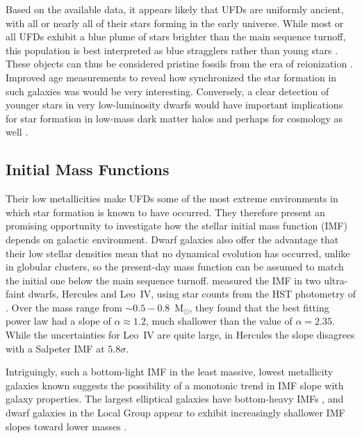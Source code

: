\documentclass[a4paper]{ar-1col}
\newcommand{\msun}        {M$_{\odot}$}
\begin{document}
Based on the available data, it appears likely that UFDs are uniformly
ancient, with all or nearly all of their stars forming in the early
universe.  While most or all UFDs exhibit a blue plume of stars
brighter than the main sequence turnoff, this population is best
interpreted as blue stragglers rather than young stars
\citep{santana13}.  These objects can thus be considered pristine
fossils from the era of reionization \citep[e.g.,][]{br09,br11a,sf09}.
Improved age measurements to reveal how synchronized the star
formation in such galaxies was would be very interesting.  Conversely,
a clear detection of younger stars in very low-luminosity dwarfs would
have important implications for star formation in low-mass dark matter
halos and perhaps for cosmology as well \citep[e.g.,][]{bozek18}.


\subsection{Initial Mass Functions}

Their low metallicities make UFDs some of the most extreme
environments in which star formation is known to have occurred.  They
therefore present an promising opportunity to investigate how the
stellar initial mass function (IMF) depends on galactic environment.
Dwarf galaxies also offer the advantage that their low stellar
densities mean that no dynamical evolution has occurred, unlike in
globular clusters, so the present-day mass function can be assumed to
match the initial one below the main sequence turnoff.  \citet{geha13}
measured the IMF in two ultra-faint dwarfs, Hercules and Leo~IV, using
star counts from the HST photometry of \citet{brown12}.  Over the mass
range from $\sim0.5-0.8$~\msun, they found that the best fitting power
law had a slope of $\alpha \approx 1.2$, much shallower than the
\citet{salpeter55} value of $\alpha = 2.35$.  While the uncertainties
for Leo~IV are quite large, in Hercules the slope disagrees with a
Salpeter IMF at $5.8\sigma$.

Intriguingly, such a bottom-light IMF in the least massive, lowest
metallicity galaxies known suggests the possibility of a monotonic
trend in IMF slope with galaxy properties.  The largest elliptical
galaxies have bottom-heavy IMFs \citep[e.g.,][]{vdc10,spiniello12},
and dwarf galaxies in the Local Group appear to exhibit increasingly
shallower IMF slopes toward lower masses \citep{geha13}.
\end{document}
